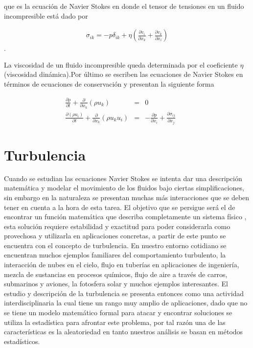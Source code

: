 \noindent que es la ecuación de Navier Stokes en donde el tensor de tensiones en un fluido incompresible está dado por 

\begin{eqnarray}
\sigma_{ik} = -p\delta_{ik} + \eta\left(\frac{\partial v_{i}}{\partial x_{k}} + \frac{\partial v_{k}}{\partial x_{i}  }\right)
\end{eqnarray}.

\noindent La viscosidad de un fluido incompresible queda determinada por el coeficiente $\eta$ (viscosidad dinámica).Por último se escriben las ecuaciones de Navier Stokes en términos de ecuaciones de conservación y presentan la siguiente forma 

\begin{eqnarray}
\label{continuidad}
\frac{\partial \rho}{\partial t}+\frac{\partial }{\partial x_{k}}(\rho u_{k})&=& 0 \qquad \\
\label{NS}
\frac{\partial(\rho u_{i})}{\partial t}+\frac{\partial}{\partial x_{k}}(\rho u_{k}u_{i})&=&-\frac{\partial p}{\partial x_{i}}+\frac{\partial \sigma_{ij}}{\partial x_{j}} \qquad 
\end{eqnarray}

\section{Turbulencia}

\noindent Cuando se estudian las ecuaciones  Navier Stokes se intenta dar una descripción matemática y modelar el movimiento de los fluidos bajo ciertas simplificaciones, sin embargo en la naturaleza se presentan muchas más interacciones que se deben tener en cuenta a la hora de esta tarea. El objetivo que se persigue será el de encontrar un función matemática que describa completamente un sistema físico , esta solución requiere estabilidad y exactitud para poder considerarla como provechosa y utilizarla en aplicaciones concretas, a partir de este punto se encuentra con el concepto de turbulencia. En nuestro entorno cotidiano se encuentran muchos ejemplos familiares del comportamiento turbulento, la interacción de nubes en el cielo, flujo en tuberías en aplicaciones de ingeniería, mezcla de sustancias en procesos químicos, flujo de aire a través de carros, submarinos y aviones, la fotosfera solar y muchos ejemplos interesantes. El estudio y descripción de la turbulencia se presenta entonces como una actividad interdisciplinaria la cual tiene un rango muy amplio de aplicaciones, dado que no se tiene un modelo matemático formal para atacar y encontrar soluciones se utiliza la estadística para afrontar este problema, por tal razón una de las características es la aleatoriedad en tanto nuestros análisis se basan en métodos estadísticos. 

